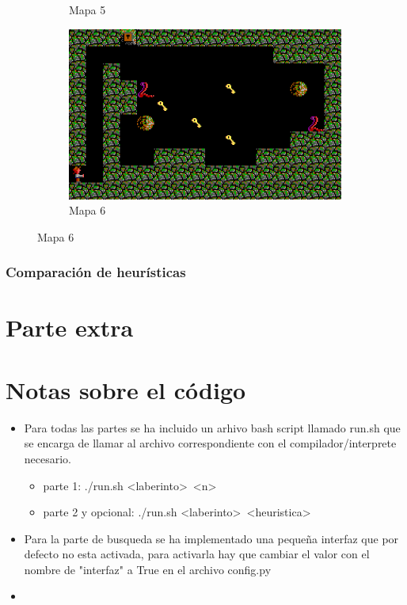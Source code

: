 \documentclass[11pt,spanish]{article}
\begin{document}
\begin{figure}[H]
\begin{subfigure}[b]{0.24\linewidth}
					\caption{Mapa 5}
				\end{subfigure}
				\begin{subfigure}[b]{0.39\linewidth}
					\includegraphics[width=\linewidth]{astar/lab6.png}
					\caption{Mapa 6}
				\end{subfigure}
			\end{figure}
			
		\subsubsection{Comparación de heurísticas}
	\section{Parte extra}
	\section{Notas sobre el código}
	\begin{itemize}
		\item Para todas las partes se ha incluido un arhivo bash script llamado run.sh que se encarga de llamar al archivo correspondiente con el compilador/interprete necesario.
		\begin{itemize}
			\item parte 1: ./run.sh <laberinto>\ <n>
			\item parte 2 y opcional: ./run.sh <laberinto>\ <heuristica>
		\end{itemize}
		\item Para la parte de busqueda se ha implementado una pequeña interfaz que por defecto no esta activada, para activarla hay que cambiar el valor con el nombre de "interfaz" a True en el archivo config.py
		\item 
	\end{itemize}
	

\end{document}
